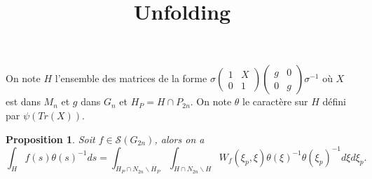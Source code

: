 \documentclass{amsart}
\newtheorem{proposition}{Proposition}[section]
\begin{document}
\title{Unfolding}
\maketitle 
 
 On note $H$ l'ensemble des matrices de la forme $\sigma \begin{pmatrix}
1 & X \\
0 & 1
\end{pmatrix}\begin{pmatrix}
g & 0 \\
0 & g
\end{pmatrix} \sigma^{-1}$ où $X$ est dans $M_n$ et $g$ dans $G_n$ et $H_P = H \cap P_{2n}$. On note $\theta$ le caractère sur $H$ défini par $\psi(Tr(X))$.

\begin{proposition}
Soit $f \in \mathcal{S}(G_{2n})$, alors on a
\begin{equation}
\int_{H} f(s) \theta(s)^{-1} ds = \int_{H_P \cap N_{2n} \backslash{H_P}} \int_{H \cap N_{2n} \backslash{H}} W_f(\xi_p, \xi) \theta(\xi)^{-1} \theta(\xi_p)^{-1} d\xi d\xi_p .
\end{equation}
\end{proposition}
\end{document}
